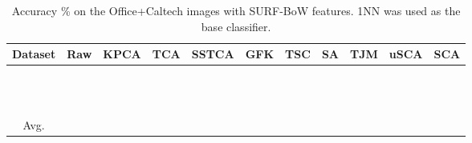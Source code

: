 \documentclass[10pt,journal,compsoc]{IEEEtran}
\begin{document}
\begin{table*}[!htb]
\caption{Accuracy \% on the Office+Caltech images with SURF-BoW features.
    1NN was used as the base classifier.}
    \vspace{-1em}
\centering
\begin{tabular}{| c || c | c | c  | c | c | c | c | c | c | c | }
\hline
Dataset           & Raw     & KPCA      &  TCA     & SSTCA &  GFK & TSC & SA      & TJM     & uSCA    & SCA    \\
\hline
\hline
 &  &  &  &   & {\color{red}} &  &  &  &  &                                  \\
 &  &   &  &   &  &  &  & {\color{red} } &  &                                  \\
 &  &   &  &   & {\color{red}} &  &   &  &  &                                  \\
 &  &   &  &  &  &  & {\color{red}} &  &  &                                  \\
 &  &    &    &   &  &  &    &  &  & {\color{red}}                                   \\
 &  &   &  &  &  &  &  &  &  & {\color{red}}                                 \\
 &  &   &  &  &  &  & {\color{red}} &  &  &                                  \\
 &  &   &  &  &  &  &  & {\color{red}} &  &                                  \\
 &  &   &  &  &  &  &  &  &  & {\color{red}}                                 \\
 &  &   &  &  &  &  &  & {\color{red}} &  &                                  \\
 &  &   &  &  & {\color{red}} &  &  &  &  &                                  \\
 &  &   &  &  &  &  & {\color{red}} &  &  &                                   \\
\hline
\hline
Avg.              &  &   &  &  &  &  &  &  &  & {\color{red} } \\
\hline
\end{tabular}
\label{tab:office_results_surf_cv}
\end{table*}
\end{document}
